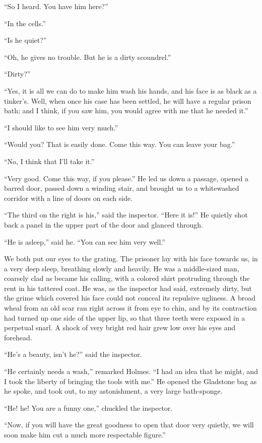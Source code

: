 “So I heard. You have him here?”

“In the cells.”

“Is he quiet?”

“Oh, he gives no trouble. But he is a dirty scoundrel.”

“Dirty?”

“Yes, it is all we can do to make him wash his hands, and
his face is as black as a tinker’s. Well, when once his case
has been settled, he will have a regular prison bath; and I
think, if you saw him, you would agree with me that he needed
it.”

“I should like to see him very much.”

“Would you? That is easily done. Come this way. You
can leave your bag.”

“No, I think that I’ll take it.”

“Very good. Come this way, if you please.” He led us
down a passage, opened a barred door, passed down a winding
stair, and brought us to a whitewashed corridor with a
line of doors on each side.

“The third on the right is his,” said the inspector. “Here
it is!” He quietly shot back a panel in the upper part of the
door and glanced through.

“He is asleep,” said he. “You can see him very well.”

We both put our eyes to the grating. The prisoner lay
with his face towards us, in a very deep sleep, breathing slowly
and heavily. He was a middle-sized man, coarsely clad as
became his calling, with a colored shirt protruding through the
rent in his tattered coat. He was, as the inspector had said,
extremely dirty, but the grime which covered his face could
not conceal its repulsive ugliness. A broad wheal from an
old scar ran right across it from eye to chin, and by its
contraction had turned up one side of the upper lip, so that
three teeth were exposed in a perpetual snarl. A shock of
very bright red hair grew low over his eyes and forehead.

“He’s a beauty, isn’t he?” said the inspector.

“He certainly needs a wash,” remarked Holmes. “I had
an idea that he might, and I took the liberty of bringing the
tools with me.” He opened the Gladstone bag as he spoke,
and took out, to my astonishment, a very large bath-sponge.

“He! he! You are a funny one,” chuckled the
inspector.

“Now, if you will have the great goodness to open that
door very quietly, we will soon make him cut a much more
respectable figure.”

